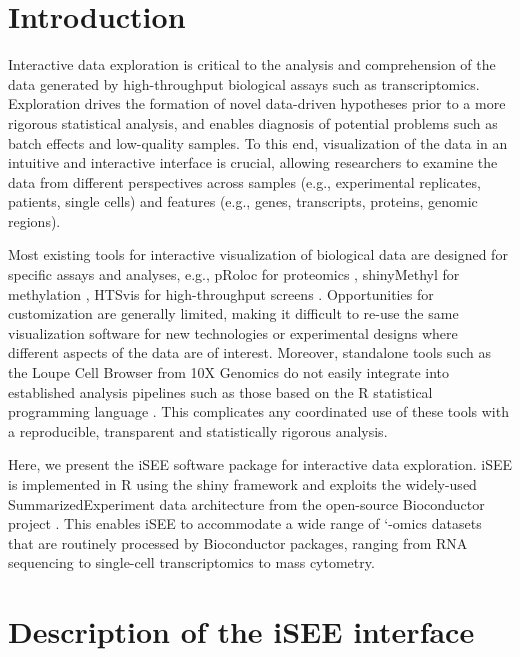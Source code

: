 \documentclass{bioinfo}
\begin{document}
\maketitle

\section{Introduction}
Interactive data exploration is critical to the analysis and comprehension of the data generated by high-throughput biological assays such as transcriptomics. 
Exploration drives the formation of novel data-driven hypotheses prior to a more rigorous statistical analysis, and enables diagnosis of potential problems such as batch effects and low-quality samples. 
To this end, visualization of the data in an intuitive and interactive interface is crucial, allowing researchers to examine the data from different perspectives across samples (e.g., experimental replicates, patients, single cells) and features (e.g., genes, transcripts, proteins, genomic regions).

Most existing tools for interactive visualization of biological data are designed for specific assays and analyses, e.g., pRoloc for proteomics \citep{gatto2014mass}, shinyMethyl for methylation \citep{fortin2014shinymethyl}, HTSvis for high-throughput screens \citep{scheeder2017htsvis}.
Opportunities for customization are generally limited, making it difficult to re-use the same visualization software for new technologies or experimental designs where different aspects of the data are of interest. 
Moreover, standalone tools such as the Loupe Cell Browser from 10X Genomics \citep{zheng2017massively} do not easily integrate into established analysis pipelines such as those based on the R statistical programming language \citep{rcore2008R}. 
This complicates any coordinated use of these tools with a reproducible, transparent and statistically rigorous analysis. 

Here, we present the iSEE software package for interactive data exploration.
iSEE is implemented in R using the shiny framework \citep{chang2017shiny} and exploits the widely-used SummarizedExperiment data architecture from the open-source Bioconductor project \citep{gentleman2004bioconductor}.
This enables iSEE to accommodate a wide range of `-omics datasets that are routinely processed by Bioconductor packages, ranging from RNA sequencing to single-cell transcriptomics to mass cytometry.

\section{Description of the iSEE interface}
\end{document}
